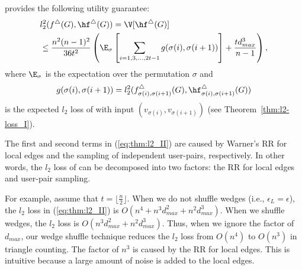 \begin{theorem}
\label{thm:l2-loss_II}
\AlgWSTri{} provides the following utility guarantee:
\begin{align}
& l_2^2(f^\triangle(G), \hf^\triangle(G)) = \V[\hf^\triangle(G)] \nonumber\\ 
& \leq \frac{n^2(n-1)^2}{36t^2} \left(\E_\sigma \left[ \sum_{i=1, 3, \ldots, 2t-1} 
g(\sigma(i),\sigma(i+1)) \right] + \frac{t d_{max}^3}{n-1}\right), \label{eq:thm:l2_II}
\end{align}
where $\E_\sigma$ is the expectation over the permutation $\sigma$ and 
\begin{align}
g(\sigma(i),\sigma(i+1)) = l_2^2(f_{\sigma(i),\sigma(i+1)}^\triangle(G), \hf_{\sigma(i),\sigma(i+1)}^\triangle(G)) 
\label{eq:thm:g}
\end{align}
is the expected $l_2$ loss of \AlgWS{} with input $(v_{\sigma(i)},v_{\sigma(i+1)})$ (see Theorem~\ref{thm:l2-loss_I}). 
\end{theorem}

The first and second terms in (\ref{eq:thm:l2_II}) are caused by 
Warner's RR for local edges and the sampling of independent user-pairs, respectively. 
In other words, the $l_2$ loss of \AlgWSTri{} can be decomposed into two factors: the RR for local edges and user-pair sampling. 

For example, assume that $t = \lfloor \frac{n}{2} \rfloor$. 
When we do not shuffle wedges (i.e., $\epsilon_L = \epsilon$), the $l_2$ loss in (\ref{eq:thm:l2_II}) is $O(n^4 + n^3 d_{max}^2 + n^2 d_{max}^3)$. 
When we shuffle wedges, the $l_2$ loss is $O(n^3 d_{max}^2 + n^2 d_{max}^3)$. 
Thus, when we ignore the factor of $d_{max}$, our wedge shuffle technique reduces the $l_2$ loss from $O(n^4)$ to $O(n^3)$ in triangle counting. 
The factor of $n^3$ is caused by the RR for local edges. 
This is intuitive because a large amount of noise is added to the local edges. 

